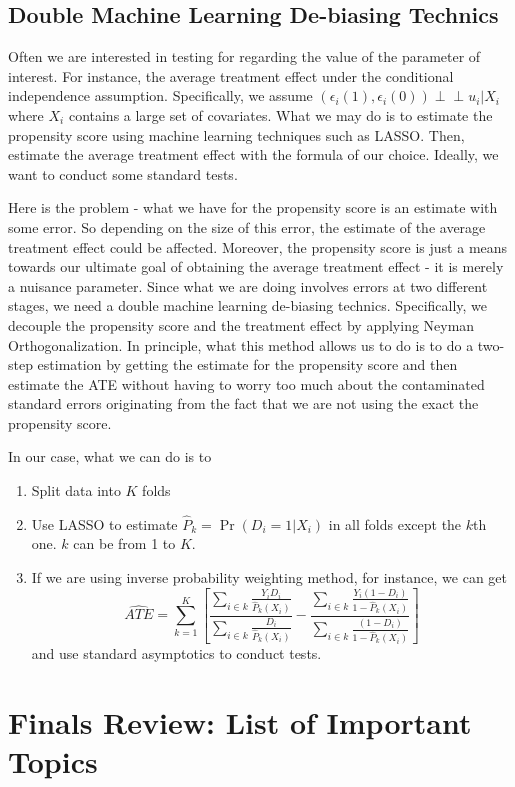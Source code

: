 \documentclass[12pt]{article}
\theoremstyle{definition}
\theoremstyle{property}
\theoremstyle{assumption}
\theoremstyle{example}
\theoremstyle{comment}
\begin{document}
\subsection{Double Machine Learning De-biasing Technics}
Often we are interested in testing for regarding the value of the parameter of interest. For instance, the average treatment effect under the conditional independence assumption. Specifically, we assume $(\epsilon_i(1),\epsilon_i(0))\perp\!\!\!\perp u_i|X_i$ where $X_i$ contains a large set of covariates. What we may do is to estimate the propensity score using machine learning techniques such as LASSO. Then, estimate the average treatment effect with the formula of our choice. Ideally, we want to conduct some standard tests. \par
Here is the problem - what we have for the propensity score is an estimate with some error. So depending on the size of this error, the estimate of the average treatment effect could be affected. Moreover, the propensity score is just a means towards our ultimate goal of obtaining the average treatment effect - it is merely a nuisance parameter. Since what we are doing involves errors at two different stages, we need a double machine learning de-biasing technics. Specifically, we decouple the propensity score and the treatment effect by applying Neyman Orthogonalization. In principle, what this method allows us to do is to do a two-step estimation by getting the estimate for the propensity score and then estimate the ATE without having to worry too much about the contaminated standard errors originating from the fact that we are not using the exact the propensity score. \par
In our case, what we can do is to
\begin{enumerate}
\item Split data into $K$ folds
\item Use LASSO to estimate $\hat{P}_k=\Pr(D_i=1|X_i)$ in all folds except the $k$th one. $k$ can be from 1 to $K$. 
\item If we are using inverse probability weighting method, for instance, we can get
\[
\widehat{ATE}=\sum_{k=1}^K\left[\frac{\sum_{i\in k}\frac{Y_iD_i}{\hat{P}_k(X_i)}}{\sum_{i\in k}\frac{D_i}{\hat{P}_k(X_i)}}-\frac{\sum_{i\in k}\frac{Y_i(1-D_i)}{1-\hat{P}_k(X_i)}}{\sum_{i\in k}\frac{(1-D_i)}{1-\hat{P}_k(X_i)}}\right]
\]
and use standard asymptotics to conduct tests. 
\end{enumerate}
\section{Finals Review: List of Important Topics}
\end{document}
